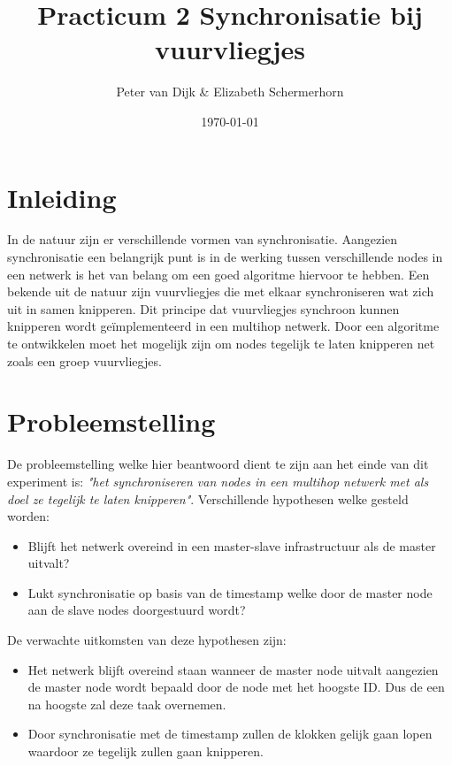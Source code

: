 \documentclass{article}
\author{Peter van Dijk \& Elizabeth Schermerhorn}
\date{\today}
\title{Practicum 2 Synchronisatie bij vuurvliegjes}
\begin{document}
\maketitle
\newpage
\tableofcontents
\clearpage
\section{Inleiding}
In de natuur zijn er verschillende vormen van synchronisatie. Aangezien synchronisatie een belangrijk punt is in de werking tussen verschillende nodes in een netwerk is het van belang om een goed algoritme hiervoor te hebben. Een bekende uit de natuur zijn vuurvliegjes die met elkaar synchroniseren wat zich uit in samen knipperen. Dit principe dat vuurvliegjes synchroon kunnen knipperen wordt ge\"{i}mplementeerd in een multihop netwerk. Door een algoritme te ontwikkelen moet het mogelijk zijn om nodes tegelijk te laten knipperen net zoals een groep vuurvliegjes. 
\section{Probleemstelling}
De probleemstelling welke hier beantwoord dient te zijn aan het einde van dit experiment is: \textit{"het synchroniseren van nodes in een multihop netwerk met als doel ze tegelijk te laten knipperen"}. 
Verschillende hypothesen welke gesteld worden:
\begin{itemize}
	\item Blijft het netwerk overeind in een master-slave infrastructuur als de master uitvalt? 
	\item Lukt synchronisatie op basis van de timestamp welke door de master node aan de slave nodes doorgestuurd wordt?
\end{itemize}
De verwachte uitkomsten van deze hypothesen zijn:
\begin{itemize}
	\item Het netwerk blijft overeind staan wanneer de master node uitvalt aangezien de master node wordt bepaald door de node met het hoogste ID. Dus de een na hoogste zal deze taak overnemen. 
	\item Door synchronisatie met de timestamp zullen de klokken gelijk gaan lopen waardoor ze tegelijk zullen gaan knipperen. 
\end{itemize}
\end{document}
